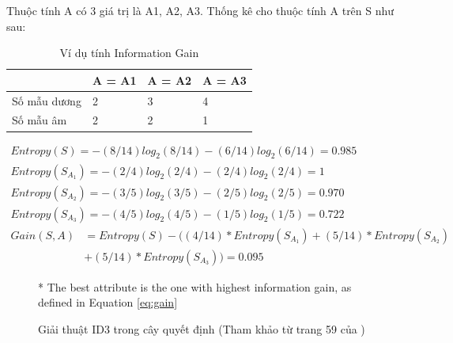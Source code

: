 \documentclass[12pt]{report}
\begin{document}
\begin{itemize}
{\begin{itemize}
{						Thuộc tính A có 3 giá trị là A1, A2, A3. Thống kê cho thuộc tính A trên S như sau:
						\begin{table}[H]
							\centering							
							\label{my-label}
							\begin{tabular}{|l|l|l|l|}
							\hline
							             & A = A1 & A = A2 & A = A3 \\ \hline
							Số mẫu dương & 2      & 3      & 4      \\ \hline
							Số mẫu âm    & 2      & 2      & 1      \\ \hline
							\end{tabular}
							\caption{Ví dụ tính Information Gain}
						\end{table}
						$\begin{aligned}							
							Entropy(S) = -(8/14)log_{2}(8/14) - (6/14)log_{2}(6/14) = 0.985				
						\end{aligned}$	
						\\
						$\begin{aligned}							
							Entropy(S_{A_1}) = -(2/4)log_{2}(2/4) - (2/4)log_{2}(2/4) = 1				
						\end{aligned}$	
						\\
						$\begin{aligned}							
							Entropy(S_{A_2}) = -(3/5)log_{2}(3/5) - (2/5)log_{2}(2/5) = 0.970
						\end{aligned}$
						\\
						$\begin{aligned}							
							Entropy(S_{A_3}) = -(4/5)log_{2}(4/5) - (1/5)log_{2}(1/5) = 0.722
						\end{aligned}$	
						\\						
						\begin{align*}							
					    	Gain(S,A) &= Entropy(S) - ((4/14)*Entropy(S_{A_1}) + (5/14)*Entropy(S_{A_2}) \\
					    	&+ (5/14)*Entropy(S_{A_3})) = 0.095					    	
						\end{align*}														
						}						
					\end{itemize}}					
				\end{itemize}
				\begin{figure}[H]
					\centering
					
					* The best attribute is the one with highest information gain, as defined in Equation 
					\ref{eq:gain}
					\caption{Giải thuật ID3 trong cây quyết định (Tham khảo từ trang 59 của \cite{mltextbook})}
					\label{fig:id3}
				\end{figure}
\end{document}
